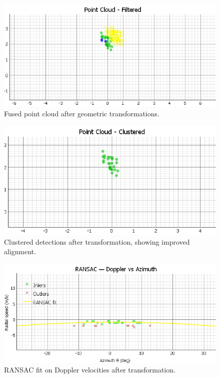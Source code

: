 \begin{figure}[!htbp]
    \centering
    \includegraphics[width=0.9\linewidth]{images/AFTERdualSensorCalib_2mts.png}
    \caption{Fused point cloud after geometric transformations.}
    \label{fig:AFTERdualSensorCalib_2mts}
\end{figure}

\begin{figure}[!htbp]
    \centering
    \includegraphics[width=0.9\linewidth]{images/AFTERdualSensorCalibCluster_2mts.png}
    \caption{Clustered detections after transformation, showing improved alignment.}
    \label{fig:AFTERdualSensorCalibCluster_2mts}
\end{figure}

\begin{figure}[!htbp]
    \centering
    \includegraphics[width=0.9\linewidth]{images/AFTERdualSensorCalibRANSAC_2mts.png}
    \caption{RANSAC fit on Doppler velocities after transformation.}
    \label{fig:AFTERdualSensorCalibRANSAC_2mts}
\end{figure}

